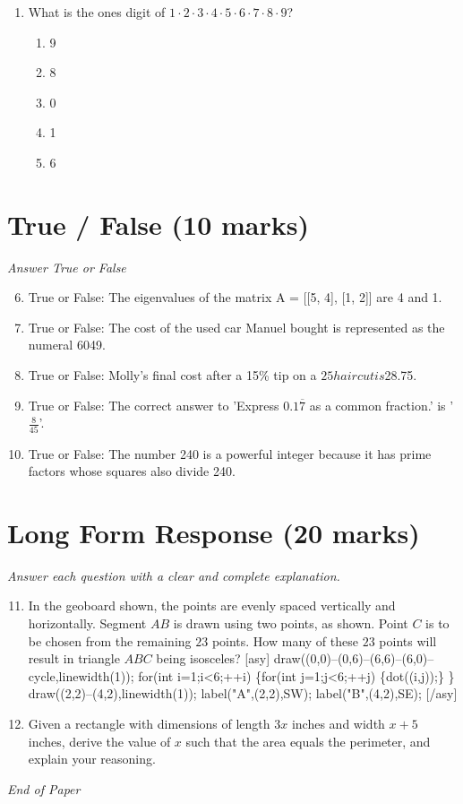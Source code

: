 \documentclass[12pt]{article}
\begin{document}
\begin{enumerate}[label=\arabic*.]
\begin{enumerate}[label=(\alph*)]
    \item 40320
    \item 7257600
\end{enumerate}
\item What is the ones digit of $1 \cdot 2 \cdot 3 \cdot 4 \cdot 5 \cdot 6 \cdot 7 \cdot 8 \cdot 9$?
\begin{enumerate}[label=(\alph*)]
    \item 9
    \item 8
    \item 0
    \item 1
    \item 6
\end{enumerate}
\end{enumerate}

\section*{True / False (10 marks)}
\textit{Answer True or False}
\begin{enumerate}[label=\arabic*.]
\setcounter{enumi}{5}
\item True or False: The eigenvalues of the matrix A = [[5, 4], [1, 2]] are 4 and 1.
\item True or False: The cost of the used car Manuel bought is represented as the numeral 6049.
\item True or False: Molly's final cost after a 15\% tip on a $25 haircut is $28.75.
\item True or False: The correct answer to 'Express $0.1\overline{7}$ as a common fraction.' is '\ensuremath{\frac{8}{45}}'.
\item True or False: The number 240 is a powerful integer because it has prime factors whose squares also divide 240.
\end{enumerate}

\section*{Long Form Response (20 marks)}
\textit{Answer each question with a clear and complete explanation.}
\begin{enumerate}[label=\arabic*.]
\setcounter{enumi}{10}
\item In the geoboard shown, the points are evenly spaced vertically and horizontally. Segment $AB$ is drawn using two points, as shown. Point $C$ is to be chosen from the remaining $23$ points. How many of these $23$ points will result in triangle $ABC$ being isosceles? [asy] draw((0,0)--(0,6)--(6,6)--(6,0)--cycle,linewidth(1)); for(int i=1;i\textless{}6;++i) \{for(int j=1;j\textless{}6;++j) \{dot((i,j));\} \} draw((2,2)--(4,2),linewidth(1)); label("A",(2,2),SW); label("B",(4,2),SE); [/asy]
\item Given a rectangle with dimensions of length $3 x$ inches and width $x + 5$ inches, derive the value of $x$ such that the area equals the perimeter, and explain your reasoning.
\end{enumerate}

\vfill
\noindent\textit{End of Paper}
\end{document}

